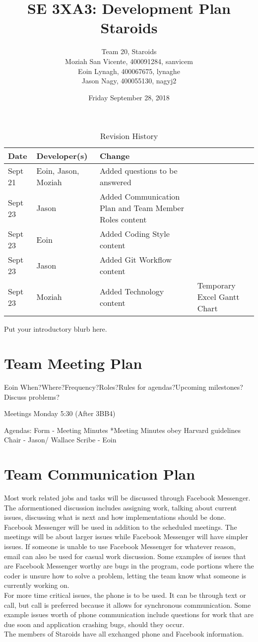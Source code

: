 \documentclass{article}
\title{SE 3XA3: Development Plan\\Staroids}
\author{Team 20, Staroids
		\\ Moziah San Vicente, 400091284, sanvicem
		\\ Eoin Lynagh, 400067675, lynaghe
		\\ Jason Nagy, 400055130, nagyj2
}
\date{Friday September 28, 2018}
\begin{document}
\begin{table}[hp]
\caption{Revision History} \label{TblRevisionHistory}
\begin{tabularx}{\textwidth}{llX}
\toprule
\textbf{Date} & \textbf{Developer(s)} & \textbf{Change}\\
\midrule
Sept 21 & Eoin, Jason, Moziah & Added questions to be answered\\
Sept 23 & Jason & Added Communication Plan and Team Member Roles content\\
Sept 23 & Eoin & Added Coding Style content\\
Sept 23 & Jason & Added Git Workflow content\\
Sept 23 & Moziah & Added Technology content & Temporary Excel Gantt Chart\\
\bottomrule
\end{tabularx}
\end{table}

\newpage

\maketitle

Put your introductory blurb here.

\section{Team Meeting Plan}
Eoin
When?Where?Frequency?Roles?Rules for agendas?Upcoming milestones?Discuss problems?

Meetings Monday 5:30 (After 3BB4)

Agendas:
Form - Meeting Minutes
*Meeting Minutes obey Harvard guidelines
Chair - Jason/ Wallace
Scribe - Eoin

\section{Team Communication Plan}
Most work related jobs and tasks will be discussed through Facebook Messenger. The aformentioned discussion includes assigning work, talking about current issues, discussing what is next and how implementations should be done. Facebook Messenger will be used in addition to the scheduled meetings. The meetings will be about larger issues while Facebook Messenger will have simpler issues. If someone is unable to use Facebook Messenger for whatever reason, email can also be used for casual work discussion. Some examples of issues that are Facebook Messenger worthy are bugs in the program, code portions where the coder is unsure how to solve a problem, letting the team know what someone is currently working on.\\
For more time critical issues, the phone is to be used. It can be through text or call, but call is preferred because it allows for synchronous communication. Some example issues worth of phone communication include questions for work that are due soon and application crashing bugs, should they occur.\\
The members of Staroids have all exchanged phone and Facebook information.\\
\end{document}
